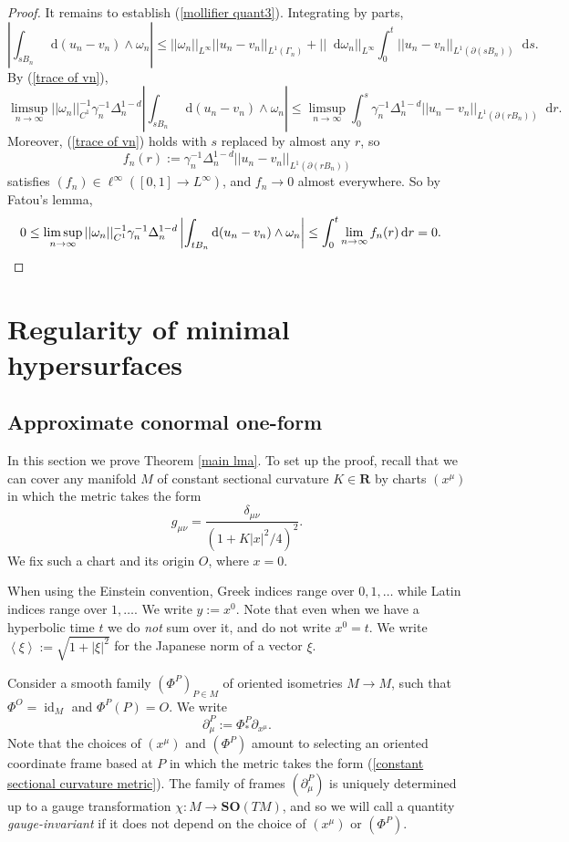 \documentclass[reqno,10pt]{amsart}
\newcommand{\RR}{\mathbf{R}}
\newcommand{\SpOrth}{\mathbf{SO}}
\DeclareMathOperator{\id}{id}
\newcommand*\dif{\mathop{}\!\mathrm{d}}
\newcommand{\dfn}[1]{\emph{#1}\index{#1}}
\def\Japan#1{\left \langle #1 \right \rangle}
\theoremstyle{definition}
\numberwithin{equation}{section}
\begin{document}
\begin{proof}
It remains to establish (\ref{mollifier quant3}).
Integrating by parts,
$$\left|\int_{sB_n} \dif (u_n - v_n) \wedge \omega_n\right| \leq ||\omega_n||_{L^\infty} ||u_n - v_n||_{L^1(\Gamma_n)} + ||\dif \omega_n||_{L^\infty} \int_0^t ||u_n - v_n||_{L^1(\partial(sB_n))} \dif s.$$
By (\ref{trace of vn}),
$$\limsup_{n \to \infty} ||\omega_n||_{C^1}^{-1} \gamma_n^{-1} \Delta_n^{1 - d} \left|\int_{sB_n} \dif(u_n - v_n) \wedge \omega_n\right| \leq \limsup_{n \to \infty} \int_0^s \gamma_n^{-1} \Delta_n^{1 - d} ||u_n - v_n||_{L^1(\partial(rB_n))} \dif r.$$
Moreover, (\ref{trace of vn}) holds with $s$ replaced by almost any $r$, so
$$f_n(r) := \gamma_n^{-1} \Delta_n^{1 - d} ||u_n - v_n||_{L^1(\partial(rB_n))}$$
satisfies $(f_n) \in \ell^\infty([0, 1] \to L^\infty)$, and $f_n \to 0$ almost everywhere.
So by Fatou's lemma,
\begin{align*}
0 \leq \limsup_{n \to \infty} ||\omega_n||_{C^1}^{-1} \gamma_n^{-1} \Delta_n^{1 - d} \left|\int_{tB_n} \dif(u_n - v_n) \wedge \omega_n\right| &\leq \int_0^t \lim_{n \to \infty} f_n(r) \dif r = 0. \qedhere
\end{align*}
\end{proof}


\section{Regularity of minimal hypersurfaces}\label{Plateau section}
\subsection{Approximate conormal one-form}
In this section we prove Theorem \ref{main lma}.
To set up the proof, recall that we can cover any manifold $M$ of constant sectional curvature $K \in \RR$ by charts $(x^\mu)$ in which the metric takes the form 
\begin{equation}\label{constant sectional curvature metric}
g_{\mu\nu} = \frac{\delta_{\mu\nu}}{(1 + K|x|^2/4)^2}.
\end{equation}
We fix such a chart and its origin $O$, where $x = 0$.

When using the Einstein convention, Greek indices range over $0, 1, \dots$ while Latin indices range over $1, \dots$.
We write $y := x^0$.
Note that even when we have a hyperbolic time $t$ we do \emph{not} sum over it, and do not write $x^0 = t$.
We write $\Japan \xi := \sqrt{1 + |\xi|^2}$ for the Japanese norm of a vector $\xi$.

Consider a smooth family $(\Phi^P)_{P \in M}$ of oriented isometries $M \to M$, such that $\Phi^O = \id_M$ and $\Phi^P(P) = O$.
We write 
$$\partial^P_\mu := \Phi^P_* \partial_{x^\mu}.$$
Note that the choices of $(x^\mu)$ and $(\Phi^P)$ amount to selecting an oriented coordinate frame based at $P$ in which the metric takes the form (\ref{constant sectional curvature metric}).
The family of frames $(\partial^P_\mu)$ is uniquely determined up to a gauge transformation $\chi: M \to \SpOrth(TM)$, and so we will call a quantity \dfn{gauge-invariant} if it does not depend on the choice of $(x^\mu)$ or $(\Phi^P)$.
\end{document}
